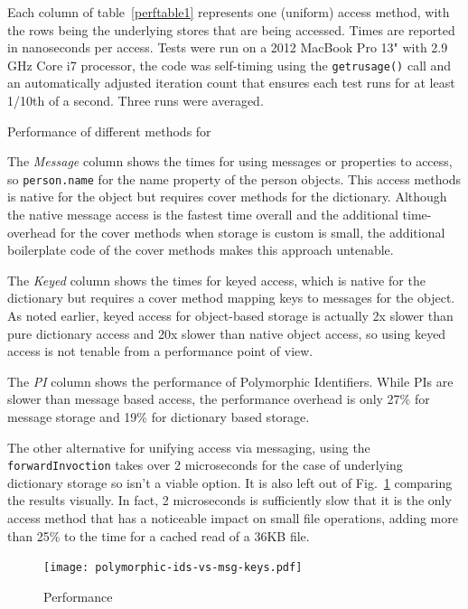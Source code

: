 \documentclass[preprint]{sigplanconf}
\begin{document}
Each column of table~\ref{perftable1} represents one (uniform) access method, with the rows being the
underlying stores that are being accessed.   Times are reported in nanoseconds per access.
Tests were run on a 2012 MacBook Pro 13" with 2.9 GHz Core i7 processor, the
code was self-timing using the {\tt getrusage()} call and an automatically adjusted iteration
count that ensures each test runs for at least 1/10th of a second.  Three runs were averaged.


\begin{table}
\center
{}
\label{perftable1}
\caption{Performance of different methods for }
\end{table}

The \emph{Message} column shows the times for using messages or properties to access, so 
{\tt person.name} for the name property of the person objects.  This access methods is native
for the object but requires cover methods for the dictionary.  Although the native message access is
the fastest time overall and the additional time-overhead for the cover methods when storage
is custom is small, the additional boilerplate code of the cover methods makes this approach
untenable.

The \emph{Keyed} column shows the times for keyed access, which is native for the dictionary
but requires a cover method mapping keys to messages for the object.  As noted earlier,
keyed access for object-based storage is actually 2x slower than pure dictionary access and
20x slower than native object access, so using keyed access is not tenable from a performance
point of view.

The \emph{PI} column shows the performance of Polymorphic Identifiers.  While PIs are slower
than message based access, the performance overhead is only 27\% for message storage and
19\% for dictionary based storage.

The other alternative for unifying access via messaging, using the {\tt forwardInvoction} takes
over 2 microseconds for the case of underlying dictionary storage so isn't a viable option.  It
is also left out of Fig.~\ref{piperfgraph1} comparing the results visually.  In fact, 2 microseconds
is sufficiently slow that it is the only access method that has a noticeable impact on small file
operations, adding more than 25\% to the time for a cached read of a 36KB file.

\begin{figure}[htbp]
\centering
\texttt{[image: polymorphic-ids-vs-msg-keys.pdf]}
\caption{Performance }
\label{piperfgraph1}
\end{figure}
\end{document}
